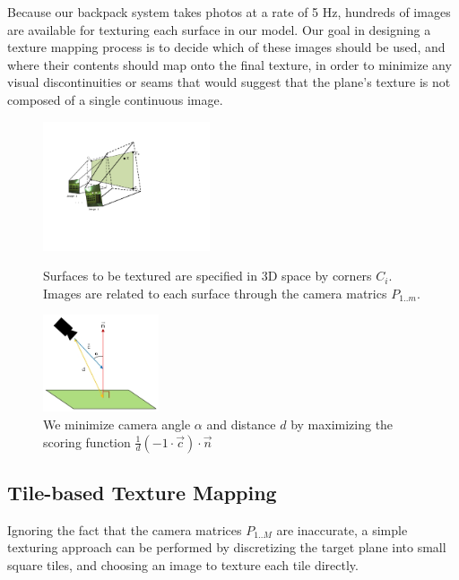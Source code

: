 \documentclass[]{spie}  %
\begin{document}
Because our backpack system takes photos at a rate of 5 Hz, hundreds
of images are available for texturing each surface in our model. Our
goal in designing a texture mapping process is to decide which of
these images should be used, and where their contents should map onto
the final texture, in order to minimize any visual discontinuities or
seams that would suggest that the plane's texture is not composed of a
single continuous image.

\begin{figure}
  \begin{minipage}[b]{0.45\linewidth}
    \centering
    \includegraphics[height=1.5in]{Projection.pdf}
    \caption{Surfaces to be textured are specified in 3D space by
      corners $C_i$. Images are related to each surface through the
      camera matrics $P_{1..m}$. }
    \label{fig:projection}
  \end{minipage}
  \hspace{0.5cm}
  \begin{minipage}[b]{0.45\linewidth}
    \centering
    \includegraphics[height=1.125in]{scoringFunction.jpg}
    \caption{We minimize camera angle $\alpha$ and distance $d$ by
      maximizing the scoring function $\frac{1}{d} (-1 \cdot \vec{c})
      \cdot \vec{n}$}
    \label{fig:scoringFunction}
  \end{minipage}
\end{figure}


\subsection{Tile-based Texture Mapping}
\label{sec:tileBasedMapping}
Ignoring the fact that the camera matrices $P_{1..M}$ are inaccurate,
a simple texturing approach can be performed by discretizing the
target plane into small square tiles, and choosing an image to texture
each tile directly.
\end{document}
